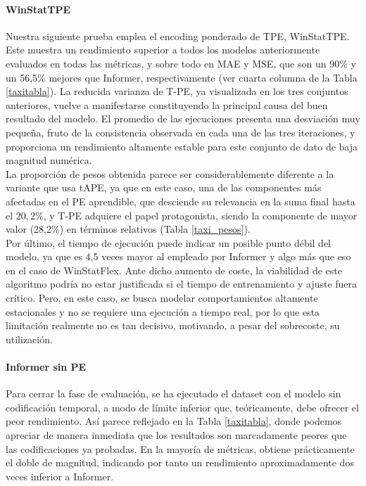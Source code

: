 \paragraph{WinStatTPE}

Nuestra siguiente prueba emplea el encoding ponderado de TPE, WinStatTPE. Este muestra un rendimiento superior a todos los modelos anteriormente evaluados en todas las métricas, y sobre todo en MAE y MSE, que son un 90\% y un 56,5\% mejores que Informer, respectivamente (ver cuarta columna de la Tabla \ref{taxitabla}). La reducida varianza de T-PE, ya visualizada en los tres conjuntos anteriores, vuelve a manifestarse constituyendo la principal causa del buen resultado del modelo. El promedio de las ejecuciones presenta una desviación muy pequeña, fruto de la consistencia observada en cada una de las tres iteraciones, y proporciona un rendimiento altamente estable para este conjunto de dato de baja magnitud numérica.\\

La proporción de pesos obtenida parece ser considerablemente diferente a la variante que usa tAPE, ya que en este caso, una de las componentes más afectadas en el PE aprendible, que desciende su relevancia en la suma final hasta el $20,2\%$, y T-PE adquiere el papel protagonista, siendo la componente de mayor valor (28,2\%) en términos relativos (Tabla \ref{taxi_pesos}).\\

Por último, el tiempo de ejecución puede indicar un posible punto débil del modelo, ya que es 4,5 veces mayor al empleado por Informer y algo más que eso en el caso de WinStatFlex. Ante dicho aumento de coste, la viabilidad de este algoritmo podría no estar justificada si el tiempo de entrenamiento y ajuste fuera crítico. Pero, en este caso, se busca modelar comportamientos altamente estacionales y no se requiere una ejecución a tiempo real, por lo que esta limitación realmente no es tan decisivo, motivando, a pesar del sobrecoste, su utilización.

\paragraph{Informer sin PE}

Para cerrar la fase de evaluación, se ha ejecutado el dataset con el modelo sin codificación temporal, a modo de límite inferior que, teóricamente, debe ofrecer el peor rendimiento. Así parece reflejado en la Tabla \ref{taxitabla}, donde podemos apreciar de manera inmediata que los resultados son marcadamente peores que las codificaciones ya probadas. En la mayoría de métricas, obtiene prácticamente el doble de magnitud, indicando por tanto un rendimiento aproximadamente dos veces inferior a Informer.

